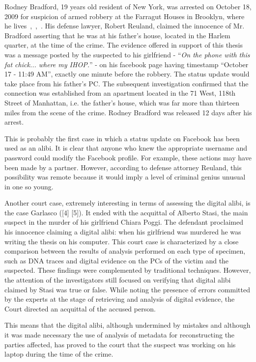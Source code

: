 \documentclass[runningheads,english]{llncs}
\begin{document}
Rodney Bradford, 19 years old resident of New York, was arrested on October 18,
2009 for suspicion of armed robbery at the Farragut Houses in Brooklyn, where he
lives~\cite{fb_msnbc},~\cite{fb_nyt},~\cite{fb_cnn}. His defense lawyer, Robert
Reuland, claimed the innocence of Mr. Bradford asserting that he was at his
father's house, located in the Harlem quarter, at the time of the crime. The
evidence offered in support of this thesis was a message posted by the suspected
to his girlfriend - ``\emph{On the phone with this fat chick... where my
IHOP.}'' - on his facebook page having timestamp ``October 17 - 11:49 AM'',
exactly one minute before the robbery. The status update would take place from
his father's PC. The subsequent investigation confirmed that the connection was
established from an apartment located in the 71 West, 118th Street of Manhattan,
i.e. the father's house, which was far more than thirteen miles from the scene
of the crime. Rodney Bradford was released 12 days after his arrest. 

This is probably the first case in which a status update on Facebook has been
used as an alibi. It is clear that anyone who knew the appropriate username and
password could modify the Facebook profile. For example, these actions may have
been made by a partner. However, according to defense attorney Reuland, this
possibility was remote because it would imply a level of criminal genius unusual
in one so young.


Another court case, extremely interesting in terms of assessing the digital
alibi, is the case Garlasco ([4] [5]). It ended with the acquittal of Alberto
Stasi, the main suspect in the murder of his girlfriend Chiara Poggi. The
defendant proclaimed his innocence claiming a digital alibi: when his girlfriend
was murdered he was writing the thesis on his computer. This court case is
characterized by a close comparison between the results of analysis performed on
each type of specimen, such as DNA traces and digital evidence on the PCs of the
victim and the suspected. These findings were complemented by traditional
techniques. However, the attention of the investigators still focused on
verifying that digital alibi claimed by Stasi was true or false. While noting
the presence of errors committed by the experts at the stage of retrieving and
analysis of digital evidence, the Court directed an acquittal of the accused
person.

This means that the digital alibi, although undermined by mistakes and although
it was made ​​necessary the use of analysis of metadata for reconstructing the
parties affected, has proved to the court that the suspect was working on his
laptop during the time of the crime.
\end{document}
